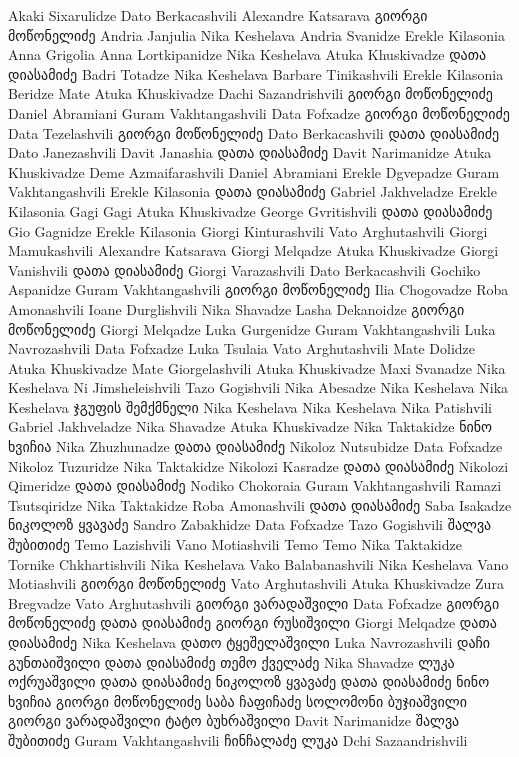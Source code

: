 Akaki Sixarulidze
 Dato Berkacashvili
Alexandre Katsarava
 გიორგი მოწონელიძე
Andria Janjulia
 Nika Keshelava
Andria Svanidze
 Erekle Kilasonia
Anna Grigolia
Anna Lortkipanidze
 Nika Keshelava
Atuka Khuskivadze
 დათა დიასამიძე
Badri Totadze
 Nika Keshelava
Barbare Tinikashvili
 Erekle Kilasonia
Beridze Mate
 Atuka Khuskivadze
Dachi Sazandrishvili
 გიორგი მოწონელიძე
Daniel Abramiani
 Guram Vakhtangashvili
Data Fofxadze
 გიორგი მოწონელიძე
Data Tezelashvili
 გიორგი მოწონელიძე
Dato Berkacashvili
 დათა დიასამიძე
Dato Janezashvili
Davit Janashia
 დათა დიასამიძე
Davit Narimanidze
 Atuka Khuskivadze
Deme Azmaifarashvili
 Daniel Abramiani
Erekle Dgvepadze
 Guram Vakhtangashvili
Erekle Kilasonia
 დათა დიასამიძე
Gabriel Jakhveladze
 Erekle Kilasonia
Gagi Gagi
 Atuka Khuskivadze
George Gvritishvili
 დათა დიასამიძე
Gio Gagnidze
 Erekle Kilasonia
Giorgi Kinturashvili
 Vato Arghutashvili
Giorgi Mamukashvili
 Alexandre Katsarava
Giorgi Melqadze
 Atuka Khuskivadze
Giorgi Vanishvili
 დათა დიასამიძე
Giorgi Varazashvili
 Dato Berkacashvili
Gochiko Aspanidze 
Guram Vakhtangashvili
 გიორგი მოწონელიძე
Ilia Chogovadze
 Roba Amonashvili
Ioane Durglishvili
 Nika Shavadze
Lasha Dekanoidze
 გიორგი მოწონელიძე
 Giorgi Melqadze
Luka Gurgenidze
 Guram Vakhtangashvili
Luka Navrozashvili
 Data Fofxadze
Luka Tsulaia
 Vato Arghutashvili
Mate Dolidze
 Atuka Khuskivadze
Mate Giorgelashvili
 Atuka Khuskivadze
Maxi Svanadze
 Nika Keshelava
Ni Jimsheleishvili
 Tazo Gogishvili
Nika Abesadze
 Nika Keshelava
Nika Keshelava
ჯგუფის შემქმნელი
Nika Keshelava
 Nika Keshelava
Nika Patishvili
 Gabriel Jakhveladze
Nika Shavadze
 Atuka Khuskivadze
Nika Taktakidze
 ნინო ხვიჩია
Nika Zhuzhunadze
 დათა დიასამიძე
Nikoloz Nutsubidze
 Data Fofxadze
Nikoloz Tuzuridze
 Nika Taktakidze
Nikolozi Kasradze
 დათა დიასამიძე
Nikolozi Qimeridze
 დათა დიასამიძე
Nodiko Chokoraia
 Guram Vakhtangashvili
Ramazi Tsutsqiridze
 Nika Taktakidze
Roba Amonashvili
 დათა დიასამიძე
Saba Isakadze
 ნიკოლოზ ყვავაძე
Sandro Zabakhidze
 Data Fofxadze
Tazo Gogishvili
 შალვა შუბითიძე
Temo Lazishvili
 Vano Motiashvili
Temo Temo
 Nika Taktakidze
Tornike Chkhartishvili
 Nika Keshelava
Vako Balabanashvili
 Nika Keshelava
Vano Motiashvili
 გიორგი მოწონელიძე
Vato Arghutashvili
 Atuka Khuskivadze
Zura Bregvadze
 Vato Arghutashvili
გიორგი ვარადაშვილი
 Data Fofxadze
გიორგი მოწონელიძე
 დათა დიასამიძე
გიორგი რუსიშვილი
 Giorgi Melqadze
დათა დიასამიძე
 Nika Keshelava
დათო ტყეშელაშვილი
 Luka Navrozashvili
დაჩი გუნთაიშვილი
 დათა დიასამიძე
თემო ქველაძე 
 Nika Shavadze
ლუკა ოქრუაშვილი
 დათა დიასამიძე
ნიკოლოზ ყვავაძე
 დათა დიასამიძე
ნინო ხვიჩია
 გიორგი მოწონელიძე
საბა ჩაფიჩაძე
სოლომონი ბუჯიაშვილი
 გიორგი ვარადაშვილი
ტატო ბუხრაშვილი
 Davit Narimanidze
შალვა შუბითიძე
 Guram Vakhtangashvili
ჩინჩალაძე ლუკა
 Dchi Sazaandrishvili







































